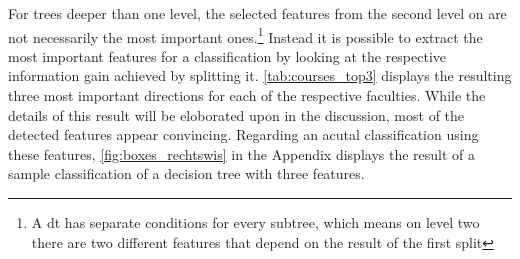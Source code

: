 \begin{figure}[h]
	\begin{center}
	\end{center}
\end{figure}

For trees deeper than one level, the selected features from the second level on are not necessarily the most important ones.\footnote{A \gls{dt} has separate conditions for every subtree, which means on level two there are two different features that depend on the result of the first split} Instead it is possible to extract the most important features for a classification by looking at the respective information gain achieved by splitting it. \autoref{tab:courses_top3} displays the resulting three most important directions for each of the respective faculties. While the details of this result will be eloborated upon in the discussion, most of the detected features appear convincing.  Regarding an acutal classification using these features, \autoref{fig:boxes_rechtswis} in the Appendix displays the result of a sample classification of a decision tree with three features.


